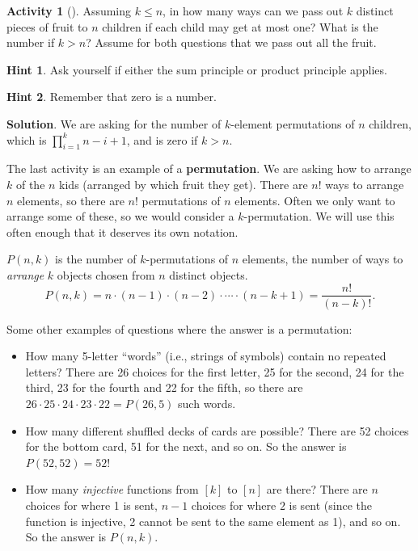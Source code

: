 \documentclass[10pt,]{book}
\newcommand{\terminology}[1]{\textbf{#1}}
\theoremstyle{plain}
\theoremstyle{definition}
\theoremstyle{definition}
\theoremstyle{definition}
\newtheorem{activity}[project]{Activity}
\theoremstyle{definition}
\numberwithin{equation}{chapter}
\begin{document}
\begin{activity}[]\label{activity-33}
\hypertarget{p-553}{}%
Assuming \(k\le n\), in how many ways can we pass out \(k\) distinct pieces of fruit to \(n\) children if each child may get at most one? What is the number if \(k>n\)? Assume for both questions that we pass out all the fruit.%
\par\smallskip%
\noindent\textbf{Hint 1}.\hypertarget{hint-20}{}\quad%
\hypertarget{p-554}{}%
Ask yourself if either the sum principle or product principle applies.%
\par\smallskip%
\noindent\textbf{Hint 2}.\hypertarget{hint-21}{}\quad%
\hypertarget{p-555}{}%
Remember that zero is a number.%
\par\smallskip%
\noindent\textbf{Solution}.\hypertarget{solution-44}{}\quad%
\hypertarget{p-556}{}%
We are asking for the number of \(k\)-element permutations of \(n\) children, which is \(\prod_{i=1}^k n-i+1\), and is zero if \(k>n\).%
\end{activity}
\hypertarget{p-557}{}%
The last activity is an example of a \terminology{permutation}.  We are asking how to arrange \(k\) of the \(n\) kids (arranged by which fruit they get).  There are \(n!\) ways to arrange \(n\) elements, so there are \(n!\) permutations of \(n\) elements.  Often we only want to arrange some of these, so we would consider a \(k\)-permutation.   We will use this often enough that it deserves its own notation.%
\begin{assemblage}\label{assemblage-permutation}
\hypertarget{p-558}{}%
\(P(n,k)\) is the number of \(k\)-permutations of \(n\) elements, the number of ways to \emph{arrange} \(k\) objects chosen from \(n\) distinct objects.%
\begin{equation*}
P(n,k) = n\cdot (n-1) \cdot (n-2) \cdot \cdots \cdot (n-k+1) = \frac{n!}{(n-k)!}.
\end{equation*}
%
\end{assemblage}
\hypertarget{p-559}{}%
Some other examples of questions where the answer is a permutation: \leavevmode%
\begin{itemize}[label=\textbullet]
\item{}\hypertarget{p-560}{}%
How many 5-letter ``words'' (i.e., strings of symbols) contain no repeated letters?  There are 26 choices for the first letter, 25 for the second, 24 for the third, 23 for the fourth and 22 for the fifth, so there are \(26\cdot 25 \cdot 24 \cdot 23 \cdot 22 = P(26,5)\) such words.%
\item{}\hypertarget{p-561}{}%
How many different shuffled decks of cards are possible?  There are 52 choices for the bottom card, 51 for the next, and so on.  So the answer is \(P(52,52) = 52!\)%
\item{}\hypertarget{p-562}{}%
How many \emph{injective} functions from \([k]\) to \([n]\) are there?  There are \(n\) choices for where 1 is sent, \(n-1\) choices for where \(2\) is sent (since the function is injective, 2 cannot be sent to the same element as 1), and so on.  So the answer is \(P(n,k)\).%
\end{itemize}
\end{document}
